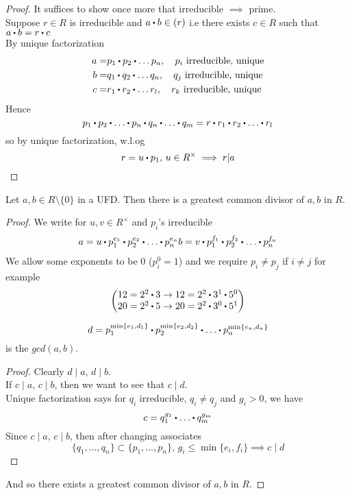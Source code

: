 \documentclass[../Main.tex]{subfiles}
\begin{document}
\begin{proof}
	It suffices to show once more that irreducible $\implies$ prime.\\
	Suppose $r\in R$ is irreducible and $a\rdot b\in (r)$ i.e there exists $c\in R$ such that $a\rdot b=r\rdot c$\\
	By unique factorization
	\begin{align*}
	a=&p_1\rdot p_2\rdot \dots p_n,\quad p_i \text{ irreducible, unique}\\
	b=&q_1\rdot q_2\rdot \dots q_n,\quad q_j \text{ irreducible, unique}\\
	c=&r_1\rdot r_2\rdot \dots r_l,\quad r_k \text{ irreducible, unique}
	\end{align*}
	Hence
	\[p_1\rdot p_2\rdot \dots \rdot p_n \rdot q_n \rdot \dots \rdot q_m = r \rdot r_1 \rdot r_2\rdot  \dots \rdot r_l\]
	so by unique factorization, w.l.og
	\[r=u\rdot p_1,\, u\in R^\times \implies r|a\]
\end{proof}
\begin{prop}
	Let $a,b\in R\setminus \{0\}$ in a UFD. Then there is a greatest common divisor of $a,b$ in $R$.
\end{prop}
\begin{proof}
	We write for $u,v\in R^\times$ and $p_i$'s irreducible
	\begin{align*}
	a=u\rdot p_1^{e_1}\rdot p_2^{e_2}\rdot \dots \rdot p_n^{e_n}
	b=v\rdot p_1^{f_1}\rdot p_2^{f_2}\rdot \dots \rdot p_n^{f_n}
	\end{align*}
	We allow some exponents to be $0$ ($p_i^0=1$) and we require $p_i\ne p_j$ if $i\ne j$ for example
	\[\begin{pmatrix}
	12=2^2\rdot 3 \to 12= 2^2\rdot 3^1\rdot 5^0 \\
	20=2^2\rdot 5 \to 20 =2^2\rdot 3^0\rdot 5^1 
	\end{pmatrix}\]
	\begin{claim}
		\[d=p_1^{\min\{e_1,d_1\}}\rdot p_2^{\min\{e_2,d_2\}}\rdot \dots \rdot p_n^{\min\{e_n,d_n\}}\]
		is the $gcd(a,b)$.
	\end{claim}
	\begin{proof}
		Clearly $d\mid a,\, d\mid b$.\\
		If $c\mid a, \, c\mid b$, then we want to see that $c\mid d$.\\
		Unique factorization says for $q_i$ irreducible, $q_i\ne q_j$ and $g_i>0$, we have
		\[c=q_1^{g_1}\rdot \dots \rdot q_m^{g_m}\]
		Since $c\mid a,\, c\mid b$, then after changing associates
		\[\{q_1,\dots,q_n\}\subset \{p_1,\dots,p_n\}, \, g_i\le \min\{e_i,f_i\}\implies c\mid d\]
	\end{proof}
	And so there exists a greatest common divisor of $a,b$ in $R$.
\end{proof}
\end{document}
